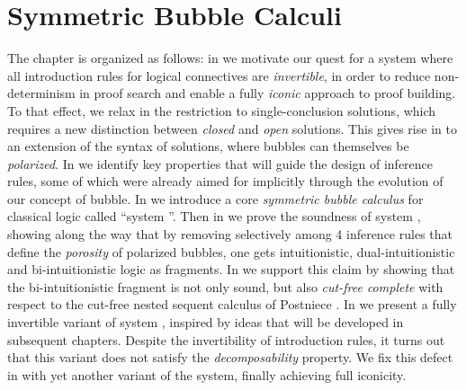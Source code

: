 \setchapterpreamble[u]{\margintoc}
\chapter{Symmetric Bubble Calculi}


The chapter is organized as follows: in  we motivate our
quest for a system where all introduction rules for logical connectives are
\emph{invertible}, in order to reduce non-determinism in proof search and enable
a fully \emph{iconic} approach to proof building. To that effect, we relax in
 the restriction to single-conclusion solutions, which
requires a new distinction between \emph{closed} and \emph{open} solutions. This
gives rise in  to an extension of the syntax of solutions, where
bubbles can themselves be \emph{polarized}. In  we identify
key properties that will guide the design of inference rules, some of which were
already aimed for implicitly through the evolution of our concept of bubble. In
 we introduce a core \emph{symmetric bubble calculus}
for classical logic called ``system ''. Then in
 we prove the soundness of system , showing
along the way that by removing selectively among 4 inference rules that define
the \emph{porosity} of polarized bubbles, one gets intuitionistic,
dual-intuitionistic and bi-intuitionistic logic as fragments. In
 we support this claim by showing that the
bi-intuitionistic fragment is not only sound, but also \emph{cut-free complete}
with respect to the cut-free nested sequent calculus of Postniece
\cite{postniece_deep_2009}. In  we present a fully
invertible variant of system , inspired by ideas that will be developed
in subsequent chapters. Despite the invertibility of introduction rules, it
turns out that this variant does not satisfy the \emph{decomposability}
property. We fix this defect in  with yet another
variant of the system, finally achieving full iconicity.



